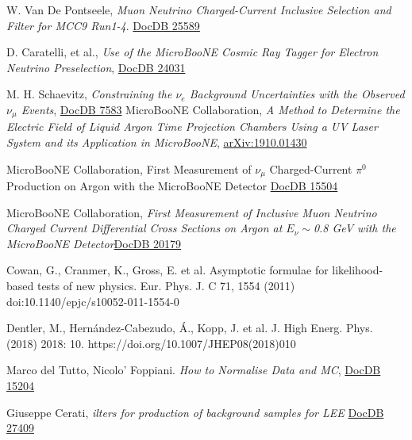 \documentclass[a4paper]{article}
\begin{document}
\begin{thebibliography}{}
W. Van De Pontseele, \emph{Muon Neutrino Charged-Current Inclusive Selection and Filter for MCC9 Run1-4}. \href{https://microboone-docdb.fnal.gov/cgi-bin/private/ShowDocument?docid=25589}{DocDB 25589}

D. Caratelli, et al., \emph{Use of the MicroBooNE Cosmic Ray Tagger for Electron Neutrino Preselection}, \href{https://microboone-docdb.fnal.gov/cgi-bin/private/RetrieveFile?docid=24031&filename=CRTPACTechnote.pdf&version=1}{DocDB 24031}

M. H. Schaevitz, \emph{Constraining the $\nu_e$ Background Uncertainties with the Observed $\nu_\mu$ Events}, \href{https://microboone-docdb.fnal.gov/cgi-bin/private/RetrieveFile?docid=7583}{DocDB 7583}
MicroBooNE Collaboration, \emph{A Method to Determine the Electric Field of Liquid Argon Time Projection Chambers Using a UV Laser System and its Application in MicroBooNE}, \href{https://arxiv.org/abs/1910.01430}{arXiv:1910.01430}

 MicroBooNE Collaboration, First Measurement of $\nu_\mu$ Charged-Current $\pi^0$ Production on Argon with the MicroBooNE Detector \href{https://microboone-docdb.fnal.gov/cgi-bin/private/RetrieveFile?docid=15504&filename=MicroBooNE_CCPizero_Run1_FinalVersion.pdf&version=17}{DocDB 15504}

 MicroBooNE Collaboration, \emph{First Measurement of Inclusive Muon Neutrino Charged Current Differential Cross Sections on Argon at $E_\nu \sim$0.8 GeV with the MicroBooNE Detector}\href{https://microboone-docdb.fnal.gov/cgi-bin/private/RetrieveFile?docid=20179&filename=ccinclusive_paper_prl_v4.9.pdf&version=19}{DocDB 20179}


Cowan, G., Cranmer, K., Gross, E. et al. Asymptotic formulae for likelihood-based tests of new physics. Eur. Phys. J. C 71, 1554 (2011) doi:10.1140/epjc/s10052-011-1554-0

Dentler, M., Hernández-Cabezudo, Á., Kopp, J. et al. J. High Energ. Phys. (2018) 2018: 10. https://doi.org/10.1007/JHEP08(2018)010

Marco del Tutto, Nicolo' Foppiani. \emph{How to Normalise Data and MC}, \href{https://microboone-docdb.fnal.gov/cgi-bin/private/ShowDocument?docid=15204}{DocDB 15204}

Giuseppe Cerati, \emph{ilters for production of background samples for LEE} \href{https://microboone-docdb.fnal.gov/cgi-bin/private/ShowDocument?docid=27409}{DocDB 27409}


\end{thebibliography}
\end{document}

